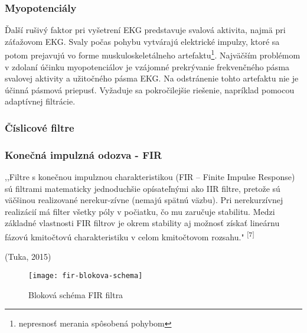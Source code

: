 \documentclass[titlepage,12pt]{article}
\begin{document}
\subsubsection{Myopotenciály}
Ďalší rušivý faktor pri vyšetrení EKG predstavuje svalová aktivita, najmä pri záťažovom EKG. Svaly počas pohybu vytvárajú elektrické impulzy, ktoré sa potom prejavujú vo forme muskuloskeletálneho artefaktu\footnote{nepresnosť merania spôsobená pohybom}. Najväčším problémom v zdolaní účinku myopotenciálov je vzájomné prekrývanie frekvenčného pásma svalovej aktivity a užitočného pásma EKG. Na odstránenie tohto artefaktu nie je účinná pásmová priepusť. Vyžaduje sa pokročilejšie riešenie, napríklad pomocou adaptívnej filtrácie. 

\newpage
\subsubsection{Číslicové filtre}

\subsubsection*{Konečná impulzná odozva - FIR}
,,Filtre s konečnou impulznou charakteristikou (FIR – Finite Impulse Response) sú filtrami  matematicky  jednoduchšie  opísateľnými  ako  IIR  filtre,  pretože  sú  väčšinou realizované nerekur-zívne (nemajú spätnú väzbu). Pri nerekurzívnej realizácií má filter všetky póly v počiatku, čo mu zaručuje stabilitu. Medzi základné vlastnosti FIR filtrov je okrem stability aj možnosť získať lineárnu fázovú kmitočtovú charakteristiku v celom kmitočtovom rozsahu." \textsuperscript{[7]}
\begin{flushright}
(Tuka, 2015)
\end{flushright}

\begin{figure}[!ht]
\begin{center}
\texttt{[image: fir-blokova-schema]}
\caption{Bloková schéma FIR filtra}
\end{center}
\end{figure}
\end{document}
